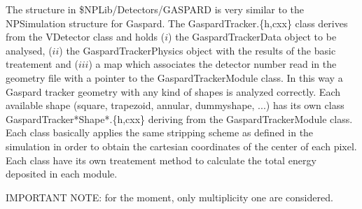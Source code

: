 \documentclass[a4paper,12pt]{article}
\begin{document}
The structure in \$NPLib/Detectors/GASPARD is very similar to the NPSimulation structure
for Gaspard. The GaspardTracker.\{h,cxx\} class derives from the VDetector class
and holds ($i$) the GaspardTrackerData object to be analysed, ($ii$) the
GaspardTrackerPhysics object with the results of the basic treatement and ($iii$)
a map which associates the detector number read in the geometry file with a pointer
to the GaspardTrackerModule class. In this way a Gaspard tracker geometry with any 
kind of shapes is analyzed correctly. Each available shape (square, trapezoid, annular,
dummyshape, ...) has its own class GaspardTracker*Shape*.\{h,cxx\} deriving from 
the GaspardTrackerModule class. Each class basically applies the same stripping scheme 
as defined in the simulation in order to obtain the cartesian coordinates of the center 
of each pixel. Each class have its own treatement method to calculate the total energy
deposited in each module.


IMPORTANT NOTE: for the moment, only multiplicity one are considered.
\end{document}
